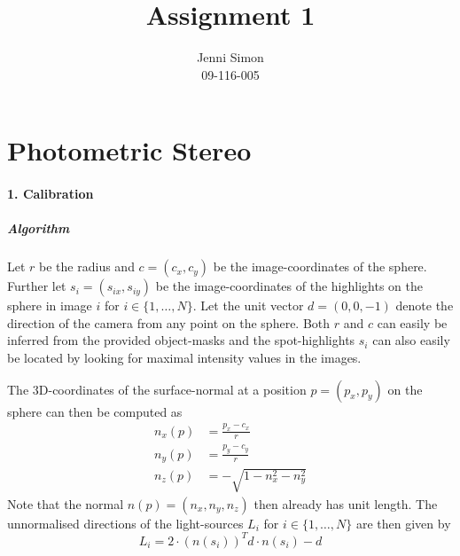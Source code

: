 \documentclass{paper}
\title{Assignment 1}
\author{Jenni Simon\\09-116-005}
\begin{document}
\maketitle


%

\section*{Photometric Stereo}



\paragraph{1. Calibration}
\subparagraph{Algorithm}
Let $r$ be the radius and $c=(c_x,c_y)$ be the image-coordinates of the
sphere. Further let $s_i=(s_{ix},s_{iy})$ be the image-coordinates of the
highlights on the sphere in image $i$ for $i\in{\{1,\hdots,N\}}$. Let the
unit vector $d=(0,0,-1)$ denote the direction of the camera from any
point on the sphere. Both $r$ and $c$ can easily be inferred from the
provided object-masks and the spot-highlights $s_i $ can also easily be
located by looking for maximal intensity values in the images.

The 3D-coordinates of the surface-normal at a position $p=(p_{x},p_{y})$ on the sphere can then be computed as 
\begin{equation} 
\begin{split}
  n_x(p)  &=  \frac{p_x-c_x}{r}      \\
  n_y (p) &=  \frac{p_y-c_y}{r}      \\
  n_z(p)  &=  -\sqrt{1-n_x^2-n_y^2}   
\end{split}   
\end{equation}
Note that the normal $n(p)=(n_x,n_y,n_z)$ then already has unit length.
The unnormalised directions of the light-sources $L_i$ for $i\in{\{1,\hdots,N\}}$ are then given by 
\begin{equation} 
L_i=2\cdot (n(s_i))^Td\cdot n(s_i)-d
\end{equation}
\end{document}
